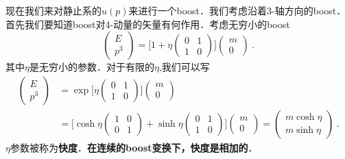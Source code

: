 现在我们来对静止系的$u(p)$来进行一个boost．我们考虑沿着3-轴方向的boost．首先我们要知道boost对4-动量的矢量有何作用．考虑无穷小的boost
\begin{equation}
\begin{pmatrix}
E \\ p^3
\end{pmatrix} = \bigg[ 1 + \eta \begin{pmatrix}
0 & 1 \\
1 & 0 
\end{pmatrix} \bigg] \begin{pmatrix}
m \\ 0
\end{pmatrix}~.
\end{equation}
其中$\eta$是无穷小的参数．对于有限的$\eta$,我们可以写
\begin{align}\nonumber
\begin{pmatrix}
E \\ p^3
\end{pmatrix} & = \exp \bigg[ \eta \begin{pmatrix}
0 & 1 \\
1& 0
\end{pmatrix} \bigg]\begin{pmatrix}
m \\ 0
\end{pmatrix} \\
& = \bigg[ \cosh \eta \begin{pmatrix}
1 & 0 \\ 0 & 1
\end{pmatrix} + \sinh \eta \begin{pmatrix}
0 & 1 \\
1 & 0
\end{pmatrix}\bigg]\begin{pmatrix}
m \\ 0
\end{pmatrix} = \begin{pmatrix}
m \cosh \eta \\ m \sinh \eta
\end{pmatrix}~.
\end{align}
$\eta$参数被称为\textbf{快度}．\textbf{在连续的boost变换下，快度是相加的}．
